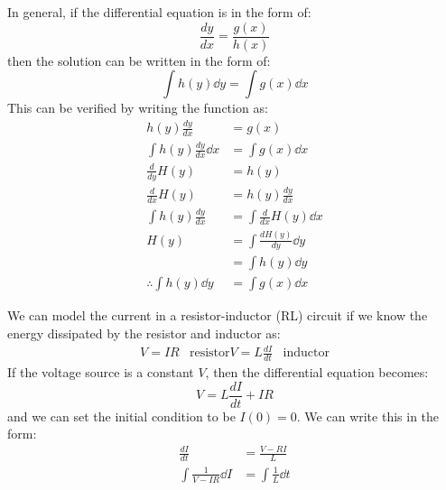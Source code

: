 \begin{itemize}
\begin{equation}
    \end{equation}
    \begin{idea}
        In general, if the differential equation is in the form of:
        \begin{equation}
            \frac{dy}{dx} = \frac{g(x)}{h(x)}
            \label{eq:}
        \end{equation}
        then the solution can be written in the form of:
        \begin{equation}
            \int h(y) \dd{y} = \int g(x) \dd{x}
            \label{eq:}
        \end{equation}
        This can be verified by writing the function as:
        \begin{align}
            h(y) \frac{dy}{dx} &= g(x) \\ 
            \int h(y) \frac{dy}{dx} \dd{x} &= \int g(x) \dd{x} \\ 
            \frac{d}{dy}H(y) &= h(y) \\
            \frac{d}{dx} H(y) &= h(y) \frac{dy}{dx} \\ 
            \int h(y) \frac{dy}{dx} &= \int \frac{d}{dx} H(y) \dd{x} \\ 
            H(y) &= \int \frac{dH(y)}{dy} \dd{y} \\ 
            &= \int h(y) \dd{y} \\ 
            \therefore \int h(y) \dd{y} &= \int g(x) \dd{x}  
        \end{align}
    \end{idea}
    \begin{example}
        We can model the current in a resistor-inductor (RL) circuit if we know the energy dissipated by the resistor and inductor as:
        \begin{align}
            V=IR &\text{resistor}
            V=L\frac{dI}{dt} & \text{inductor}
        \end{align}
        If the voltage source is a constant $V$, then the differential equation becomes:
        \begin{equation}
            V = L\frac{dI}{dt} + IR
            \label{eq:}
        \end{equation}
        and we can set the initial condition to be $I(0)=0$. We can write this in the form:
        \begin{align}
            \frac{dI}{dt} &= \frac{V-RI}{L} \\
            \int \frac{1}{V-IR} \dd{I} &= \int \frac{1}{L} \dd{t} \\ 

\end{align}
\end{example}
\end{itemize}
